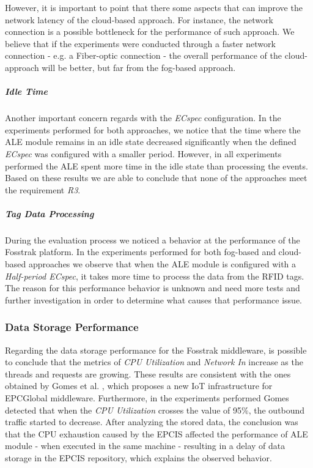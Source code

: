 However, it is important to point that there some aspects that can improve the network latency
of the cloud-based approach. For instance, the network connection is a possible bottleneck for the
performance of such approach. We believe that if the experiments were conducted through a faster
network connection - e.g. a Fiber-optic connection - the overall performance of the cloud-approach
will be better, but far from the fog-based approach.

\subparagraph{Idle Time}
\label{subp:eval_idle_time}
Another important concern regards with the \textit{ECspec} configuration. In the experiments
performed for both approaches, we notice that the time where the \gls{ALE} module remains in an idle
state decreased significantly when the defined \textit{ECspec} was configured with a smaller period.
However, in all experiments performed the \gls{ALE} spent more time in the idle state than
processing the events. Based on these results we are able to conclude that none of the approaches
meet the requirement \textit{R3}.

\subparagraph{Tag Data Processing}
\label{subp:eval_tag_processing}
During the evaluation process we noticed a behavior at the performance of the Fosstrak platform.
In the experiments performed for both fog-based and cloud-based approaches we observe that when
the \gls{ALE} module is configured with a \textit{Half-period ECspec}, it takes more time to
process the data from the \gls{RFID} tags. The reason for this performance behavior is unknown and
need more tests and further investigation in order to determine what causes that performance issue.

\subsubsection{Data Storage Performance}
\label{subs:eval_results_data}
Regarding the data storage performance for the Fosstrak middleware, is possible to conclude that the metrics
of \textit{CPU Utilization} and \textit{Network In} increase as the threads and requests are growing.
These results are consistent with the ones obtained by Gomes et al. \cite{gomes2014future}, which
proposes a new \gls{IoT} infrastructure for \gls{EPC}Global middleware. Furthermore, in the experiments
performed Gomes detected that when the \textit{CPU Utilization} crosses the value of 95$\%$, the
outbound traffic started to decrease. After analyzing the stored data, the conclusion was that the
\gls{CPU} exhaustion caused by the \gls{EPCIS} affected the performance of \gls{ALE} module - when
executed in the same machine - resulting in a delay of data storage in the \gls{EPCIS} repository,
which explains the observed behavior.\\

